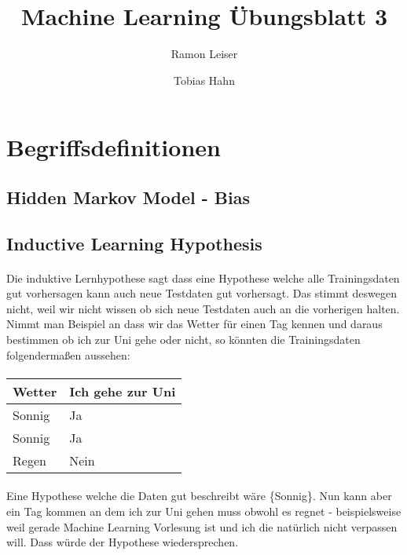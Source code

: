 \documentclass[a4paper]{article}
\title{Machine Learning Übungsblatt 3}
\author{Ramon Leiser\and Tobias Hahn}
\begin{document}
\maketitle
\newpage
\section{Begriffsdefinitionen}
\subsection{Hidden Markov Model - Bias}
\paragraph{}
\subsection{Inductive Learning Hypothesis}
\paragraph{}
Die induktive Lernhypothese sagt dass eine Hypothese welche alle Trainingsdaten gut vorhersagen kann auch neue Testdaten gut vorhersagt. Das stimmt deswegen nicht, weil wir nicht wissen ob sich neue Testdaten auch an die vorherigen halten. Nimmt man Beispiel an dass wir das Wetter für einen Tag kennen und daraus bestimmen ob ich zur Uni gehe oder nicht, so könnten die Trainingsdaten folgendermaßen aussehen:

\paragraph{}
\begin{tabular}{|l|l|}
	\hline
	Wetter & Ich gehe zur Uni \\\hline
	Sonnig & Ja \\\hline
	Sonnig & Ja  \\\hline
	Regen & Nein  \\\hline
\end{tabular}

\paragraph{}
Eine Hypothese welche die Daten gut beschreibt wäre \{Sonnig\}. Nun kann aber ein Tag kommen an dem ich zur Uni gehen muss obwohl es regnet - beispielsweise weil gerade Machine Learning Vorlesung ist und ich die natürlich nicht verpassen will. Dass würde der Hypothese wiedersprechen.
\end{document}
